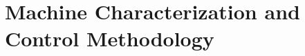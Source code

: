 
\chapter{Machine Characterization and Control Methodology}
\label{chapter:implementation} %
\minitoc%




